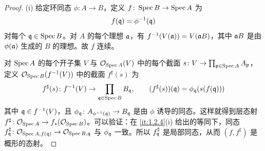 \begin{proof}
(i) 给定环同态 $\phi\colon A\to B$，定义 $f\colon\Spec B\to\Spec A$ 为
\[
f(\fq)=\phi^{-1}(\fq)
\]
对每个 $\fq\in\Spec B$。对 $A$ 的每个理想 $\fa$，有 $f^{-1}(V(\fa))=V(\fa B)$，其中 $\fa B$ 是由 $\phi(\fa)$ 生成的 $B$ 的理想。故 $f$ 连续。

对 $\Spec A$ 的每个开子集 $V$ 与 $\cO_{\Spec A}(V)$ 中的每个截面 $s\colon V\to\prod_{\fp\in\Spec A}A_{\fp}$，定义 $\cO_{\Spec B}(f^{-1}(V))$ 中的截面 $f^\sharp(s)$ 为
\[
f^\sharp(s)\colon f^{-1}(V)\to\prod_{\fq\in\Spec B}B_{\fq},\qquad (f^\sharp(s))(\fq)=\phi_{\fq}(s(f(\fq)))
\]
其中 $\fq\in f^{-1}(V)$，且 $\phi_{\fq}\colon A_{\phi^{-1}(\fq)}\to B_{\fq}$ 是由 $\phi$ 诱导的同态。这样就得到层态射 $f^\sharp\colon\cO_{\Spec A}\to f_*(\cO_{\Spec B})$。可以验证：在 \ref{it:1.2.4}(i) 给出的等同下，同态 $f^\sharp_{\fq}\colon\cO_{\Spec A,f(\fq)}\to\cO_{\Spec B,\fq}$ 与 $\phi_{\fq}$ 一致。所以 $f^\sharp_{\fq}$ 是局部同态，从而 $(f,f^\sharp)$ 是概形的态射。


\end{proof}
